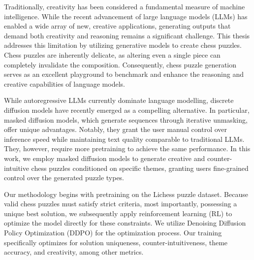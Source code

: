 \documentclass[english, 12pt, a4paper, sci, utf8, a-2b, online]{aaltothesis}
\date{July 3, 2026}
\theoremstyle{definition}
\theoremstyle{plain}
\theoremstyle{remark}
\begin{document}
{%

    \makecoverpage{}
}
\nopagecolor
{}


\makecopyrightpage{}


\begin{abstractpage}
    Traditionally, creativity has been considered a fundamental measure of machine intelligence. While the recent advancement of large language models (LLMs) has enabled a wide array of new, creative applications, generating outputs that demand both creativity and reasoning remains a significant challenge. This thesis addresses this limitation by utilizing generative models to create chess puzzles. Chess puzzles are inherently delicate, as altering even a single piece can completely invalidate the composition. Consequently, chess puzzle generation serves as an excellent playground to benchmark and enhance the reasoning and creative capabilities of language models.

    While autoregressive LLMs currently dominate language modelling, discrete diffusion models have recently emerged as a compelling alternative. In particular, masked diffusion models, which generate sequences through iterative unmasking, offer unique advantages. Notably, they grant the user manual control over inference speed while maintaining text quality comparable to traditional LLMs. They, however, require more pretraining to achieve the same performance. In this work, we employ masked diffusion models to generate creative and counter-intuitive chess puzzles conditioned on specific themes, granting users fine-grained control over the generated puzzle types.

    Our methodology begins with pretraining on the Lichess puzzle dataset. Because valid chess puzzles must satisfy strict criteria, most importantly, possessing a unique best solution, we subsequently apply reinforcement learning (RL) to optimize the model directly for these constraints. We utilize Denoising Diffusion Policy Optimization (DDPO) for the optimization process. Our training specifically optimizes for solution uniqueness, counter-intuitiveness, theme accuracy, and creativity, among other metrics.


\end{abstractpage}
\end{document}
